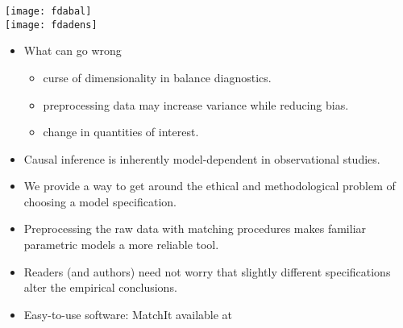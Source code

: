 \documentclass[20pt,landscape,pdftex]{foils}
\begin{document}
\hypersetup{pdfpagetransition=Replace}

\begin{center}
  \texttt{[image: fdabal]}\pause \\
  \texttt{[image: fdadens]}\pause
\end{center}



\hypersetup{pdfpagetransition=Replace}

\begin{itemize}

\item What can go wrong\pause
  \begin{itemize}
  \item curse of dimensionality in balance diagnostics.\pause
  \item preprocessing data may increase variance while reducing
    bias.\pause 
  \item change in quantities of interest.\pause
  \end{itemize}
  
\item Causal inference is inherently model-dependent in observational
  studies.\pause

\item We provide a way to get around the ethical and methodological
  problem of choosing a model specification.\pause

\item Preprocessing the raw data with matching procedures makes
  familiar parametric models a more reliable tool.\pause

\item Readers (and authors) need not worry that slightly different
  specifications alter the empirical conclusions.\pause

\item Easy-to-use software: MatchIt available at
  \pause

\end{itemize}



\hypersetup{pdfpagetransition=Replace}
\end{document}
